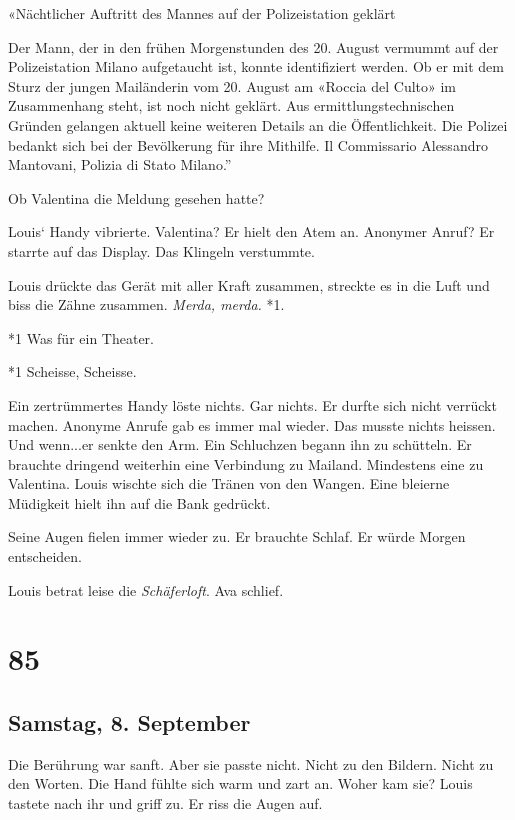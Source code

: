 «Nächtlicher Auftritt des Mannes auf der Polizeistation geklärt

Der Mann, der in den frühen Morgenstunden des 20. August vermummt auf
der Polizeistation Milano aufgetaucht ist, konnte identifiziert werden.
Ob er mit dem Sturz der jungen Mailänderin vom 20. August am «Roccia del
Culto» im Zusammenhang steht, ist noch nicht geklärt. Aus
ermittlungstechnischen Gründen gelangen aktuell keine weiteren Details
an die Öffentlichkeit. Die Polizei bedankt sich bei der Bevölkerung für
ihre Mithilfe. Il Commissario Alessandro Mantovani, Polizia di Stato
Milano.''

Ob Valentina die Meldung gesehen hatte?

Louis` Handy vibrierte. Valentina? Er hielt den Atem an. Anonymer Anruf?
Er starrte auf das Display. Das Klingeln verstummte.

Louis drückte das Gerät mit aller Kraft zusammen, streckte es in die
Luft und biss die Zähne zusammen. \emph{Merda, merda.} *1.

*1 Was für ein Theater.

*1 Scheisse, Scheisse.

Ein zertrümmertes Handy löste nichts. Gar nichts. Er durfte sich nicht
verrückt machen. Anonyme Anrufe gab es immer mal wieder. Das musste
nichts heissen. Und wenn...er senkte den Arm. Ein Schluchzen begann ihn
zu schütteln. Er brauchte dringend weiterhin eine Verbindung zu Mailand.
Mindestens eine zu Valentina. Louis wischte sich die Tränen von den
Wangen. Eine bleierne Müdigkeit hielt ihn auf die Bank gedrückt.

Seine Augen fielen immer wieder zu. Er brauchte Schlaf. Er würde Morgen
entscheiden.

Louis betrat leise die \emph{Schäferloft}. Ava schlief.

\chapter{85}\label{section-85}

\section{Samstag, 8. September}\label{samstag-8.-september}

Die Berührung war sanft. Aber sie passte nicht. Nicht zu den Bildern.
Nicht zu den Worten. Die Hand fühlte sich warm und zart an. Woher kam
sie? Louis tastete nach ihr und griff zu. Er riss die Augen auf.

